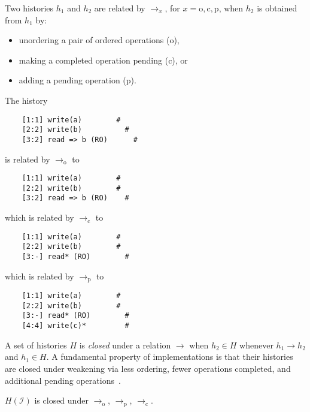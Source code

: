 Two histories $h_1$ and $h_2$ are related by $\to_x$, for $x = \mathrm{o},
\mathrm{c}, \mathrm{p}$, when $h_2$ is obtained from $h_1$ by:
\begin{itemize}

  \item unordering a pair of ordered operations (o),

  \item making a completed operation pending (c), or

  \item adding a pending operation (p).

\end{itemize}

\begin{example}
  The history
    \vspace{-1mm}
\begin{verbatim}
    [1:1] write(a)        #
    [2:2] write(b)          #
    [3:2] read => b (RO)      #
\end{verbatim}
  \vspace{-1mm}
  is related by $\to_\mathrm{o}$ to 
    \vspace{-1mm}
\begin{verbatim}
    [1:1] write(a)        #
    [2:2] write(b)        #
    [3:2] read => b (RO)    #
\end{verbatim}
  \vspace{-1mm}
which is related by $\to_\mathrm{c}$ to
  \vspace{-1mm}
\begin{verbatim}
    [1:1] write(a)        #
    [2:2] write(b)        #
    [3:-] read* (RO)        #
\end{verbatim}
  \vspace{-1mm}
which is related by $\to_\mathrm{p}$ to
  \vspace{-1mm}
\begin{verbatim}
    [1:1] write(a)        #
    [2:2] write(b)        #
    [3:-] read* (RO)        #
    [4:4] write(c)*         #
\end{verbatim}
  \vspace{-1mm}
\end{example}

A set of histories $H$ is \emph{closed} under a relation $\to$ when $h_2 \in H$
whenever $h_1 \to h_2$ and $h_1 \in H$. A fundamental property of
implementations is that their histories are closed under weakening via less
ordering, fewer operations completed, and additional pending
operations~\cite{conf/popl/BouajjaniEEH15}.

  \vspace{-1mm}
\begin{lemma}

  $H(\mathcal{I})$ is closed under $\to_\mathrm{o}$, $\to_\mathrm{p}$, 
  $\to_\mathrm{c}$.
  \vspace{-1mm}
\end{lemma}
